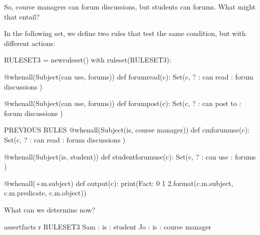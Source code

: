 \documentclass[letterpaper,10pt,english]{sphinxmanual}
\begin{document}
{So, course managers can  forum discussions, but students can  forums. What might that entail?

In the following set, we define two rules that test the same condition, but with different actions:

{
\begin{sphinxVerbatim}[commandchars=\\\{\}]
\llap{\color{nbsphinxin}[ ]:\,\hspace{\fboxrule}\hspace{\fboxsep}}RULESET\PYGZus{}3 = new\PYGZus{}ruleset()
with ruleset(RULESET\PYGZus{}3):

    @when\PYGZus{}all(Subject(\PYGZdq{}can use\PYGZdq{}, \PYGZdq{}forums\PYGZdq{}))
    def forum\PYGZus{}read(c):
        Set(c, \PYGZsq{}? : can read : forum discussions\PYGZsq{} )

    @when\PYGZus{}all(Subject(\PYGZdq{}can use\PYGZdq{}, \PYGZdq{}forums\PYGZdq{}))
    def forum\PYGZus{}post(c):
        Set(c, \PYGZsq{}? : can post to : forum discussions\PYGZsq{} )


    \PYGZsh{} \PYGZhy{}\PYGZhy{} PREVIOUS RULES \PYGZhy{}\PYGZhy{}
    @when\PYGZus{}all(Subject(\PYGZdq{}is\PYGZdq{}, \PYGZdq{}course manager\PYGZdq{}))
    def cm\PYGZus{}forum\PYGZus{}use(c):
        Set(c, \PYGZsq{}? : can read : forum discussions\PYGZsq{} )

    @when\PYGZus{}all(Subject(\PYGZdq{}is\PYGZdq{}, \PYGZdq{}student\PYGZdq{}))
    def student\PYGZus{}forum\PYGZus{}use(c):
        Set(c, \PYGZsq{}? : can use : forums\PYGZsq{} )

    @when\PYGZus{}all(+m.subject)
    def output(c):
        print(\PYGZsq{}Fact: \PYGZob{}0\PYGZcb{} \PYGZob{}1\PYGZcb{} \PYGZob{}2\PYGZcb{}\PYGZsq{}.format(c.m.subject, c.m.predicate, c.m.object))
\end{sphinxVerbatim}
}

What can we determine now?

{
\begin{sphinxVerbatim}[commandchars=\\\{\}]
\llap{\color{nbsphinxin}[ ]:\,\hspace{\fboxrule}\hspace{\fboxsep}}\PYGZpc{}\PYGZpc{}assert\PYGZus{}facts \PYGZhy{}r RULESET\PYGZus{}3
Sam : is : student
Jo : is : course manager
\end{sphinxVerbatim}
}

}
\end{document}
